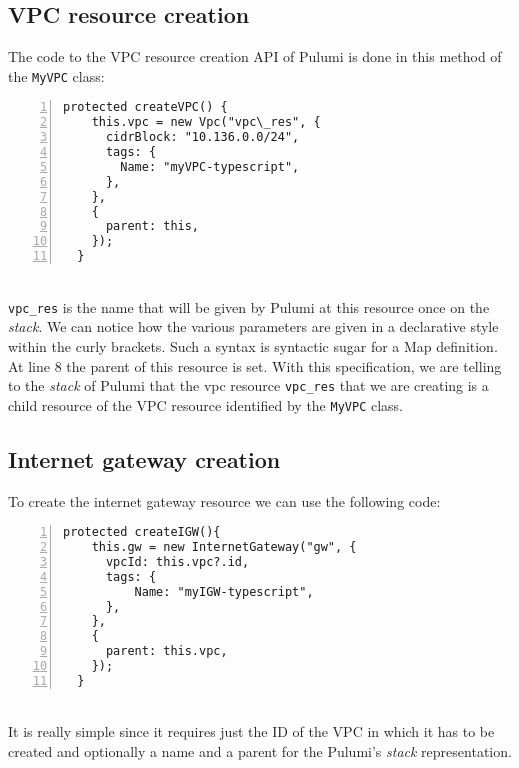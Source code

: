 \subsection{VPC resource creation}
The code to the VPC resource creation API of Pulumi is done in this method of the \texttt{MyVPC} class:
\begin{lstlisting}[numbers=left, numberstyle=\tiny, numbersep=-5pt, stepnumber=1]
  protected createVPC() {
    this.vpc = new Vpc("vpc\_res", {
      cidrBlock: "10.136.0.0/24",
      tags: {
        Name: "myVPC-typescript",
      },
    },
    {
      parent: this,
    });
  }
\end{lstlisting}\mbox{}\\
\texttt{vpc\_res} is the name that will be given by Pulumi at this resource once on the \textit{stack}.
We can notice how the various parameters are given in a declarative style within the curly brackets.
Such a syntax is syntactic sugar for a Map definition.\\
At line 8 the parent of this resource is set.
With this specification, we are telling to the \textit{stack} of Pulumi that the vpc resource \texttt{vpc\_res} that we are creating is a child resource of the VPC resource identified by the \texttt{MyVPC} class.

\subsection{Internet gateway creation}
To create the internet gateway resource we can use the following code:
\begin{lstlisting}[numbers=left, numberstyle=\tiny, numbersep=-5pt, stepnumber=1]
  protected createIGW(){
    this.gw = new InternetGateway("gw", {
      vpcId: this.vpc?.id,
      tags: {
          Name: "myIGW-typescript",
      },
    },
    {
      parent: this.vpc,
    });
  }
\end{lstlisting}\mbox{}\\
It is really simple since it requires just the ID of the VPC in which it has to be created and optionally a name and a parent for the Pulumi's \textit{stack} representation.


